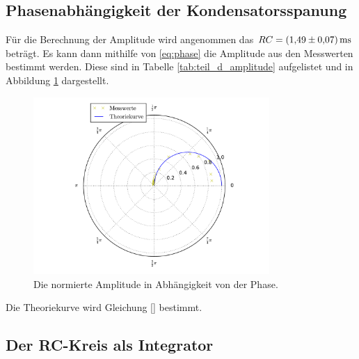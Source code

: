 \subsection{Phasenabhängigkeit der Kondensatorsspanung}

Für die Berechnung der Amplitude wird angenommen das $RC=\SI{1.49\pm0.07}{\milli\second}$
beträgt. Es kann dann mithilfe von \eqref{eq:phase} die Amplitude aus den Messwerten bestimmt werden.
Diese sind in Tabelle \ref{tab:teil_d_amplitude} aufgelistet und in Abbildung \ref{fig:plot_teil_d} dargestellt.
\FloatBarrier

\FloatBarrier
\FloatBarrier
\begin{figure}
  \centering
  \includegraphics[width=0.8\textwidth]{pics/polarplot.pdf}
  \caption{Die normierte Amplitude in Abhängigkeit von der Phase.}
  \label{fig:plot_teil_d}
\end{figure}
\FloatBarrier

Die Theoriekurve wird Gleichung \eqref{} bestimmt.

\subsection{Der RC-Kreis als Integrator}

